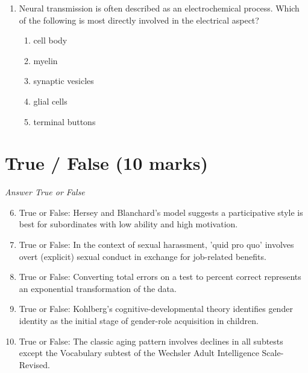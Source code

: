 \documentclass[12pt]{article}
\begin{document}
\begin{enumerate}[label=\arabic*.]
list 2, etc. Which list(s) would cause proactive interference for remembering list 2?
\begin{enumerate}[label=(\alph*)]
    \item list 4 only
    \item list 1 only
    \item lists 2 and 3 only
    \item lists 1, 3 and 4 only
    \item lists 1 and 4 only
\end{enumerate}
\item Neural transmission is often described as an electrochemical process. Which of the
following is most directly involved in the electrical aspect?
\begin{enumerate}[label=(\alph*)]
    \item cell body
    \item myelin
    \item synaptic vesicles
    \item glial cells
    \item terminal buttons
\end{enumerate}
\end{enumerate}

\section*{True / False (10 marks)}
\textit{Answer True or False}
\begin{enumerate}[label=\arabic*.]
\setcounter{enumi}{5}
\item True or False: Hersey and Blanchard's model suggests a participative style is best for subordinates with low ability and high motivation.
\item True or False: In the context of sexual harassment, 'quid pro quo' involves overt (explicit) sexual conduct in exchange for job-related benefits.
\item True or False: Converting total errors on a test to percent correct represents an exponential transformation of the data.
\item True or False: Kohlberg's cognitive-developmental theory identifies gender identity as the initial stage of gender-role acquisition in children.
\item True or False: The classic aging pattern involves declines in all subtests except the Vocabulary subtest of the Wechsler Adult Intelligence Scale-Revised.
\end{enumerate}
\end{document}
